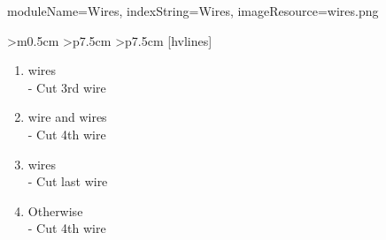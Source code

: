 \documentclass{../../ktane-mod}
\begin{document}
\begin{module}{
  moduleName=Wires,
  indexString=Wires,
  imageResource=wires.png
}
\begin{NiceTabular}{
    >{\centering\arraybackslash}m{0.5cm}
    >{\centering\arraybackslash}p{7.5cm}
    >{\centering\arraybackslash}p{7.5cm}
  }[hvlines]
\begin{minipage}[c][4cm][t]{\linewidth}
                                                     \vspace*{0.1cm}
                       \begin{enumerate}[label=\alph*.,itemsep=0pt]
                         \item \YELLOW[No YELLOW] wires\\ - Cut 3rd wire
                         \item \YELLOW[1 YELLOW] wire and \WHITE[2+ WHITE] wires\\ - Cut 4th wire
                         \item \RED[No RED] wires\\ - Cut last wire
                         \item Otherwise\\ - Cut 4th wire
                       \end{enumerate}
    \end{minipage} \\
  \end{NiceTabular}
  \renewcommand{\arraystretch}{1.0}
\end{module}
\end{document}
